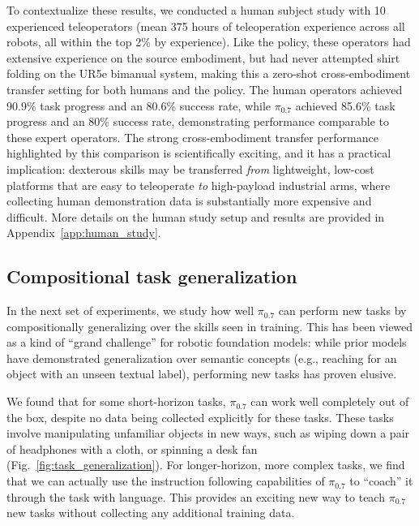 \documentclass[conference]{IEEEtran}
\def \MethodName {$\pi_{0.7}$}
\begin{document}
To contextualize these results, we conducted a human subject study with 10 experienced teleoperators (mean 375 hours of teleoperation experience across all robots, all within the top 2\% by experience). Like the policy, these operators had extensive experience on the source embodiment, but had never attempted shirt folding on the UR5e bimanual system, making this a zero-shot cross-embodiment transfer setting for both humans and the policy. The human operators achieved 90.9\% task progress and an 80.6\% success rate, while \MethodName{} achieved 85.6\% task progress and an 80\% success rate, demonstrating performance comparable to these expert operators. The strong cross-embodiment transfer performance highlighted by this comparison is scientifically exciting, and it has a practical implication: dexterous skills may be transferred \textit{from} lightweight, low-cost platforms that are easy to teleoperate \textit{to} high-payload industrial arms, where collecting human demonstration data is substantially more expensive and difficult. More details on the human study setup and results are provided in Appendix~\ref{app:human_study}.

\subsection{Compositional task generalization}
\label{sec:compositional_generalization}

In the next set of experiments, we study how well \MethodName{} can perform new tasks by compositionally generalizing over the skills seen in training. This has been viewed as a kind of ``grand challenge'' for robotic foundation models: while prior models have demonstrated generalization over semantic concepts (e.g., reaching for an object with an unseen textual label), performing new tasks has proven elusive.

We found that for some short-horizon tasks, \MethodName{} can work well completely out of the box, despite no data being collected explicitly for these tasks. These tasks involve manipulating unfamiliar objects in new ways, such as wiping down a pair of headphones with a cloth, or spinning a desk fan (Fig.~\ref{fig:task_generalization}). For longer-horizon, more complex tasks, we find that we can actually use the instruction following capabilities of \MethodName{} to ``coach'' it through the task with language. This provides an exciting new way to teach \MethodName{} new tasks without collecting any additional training data.
\end{document}
